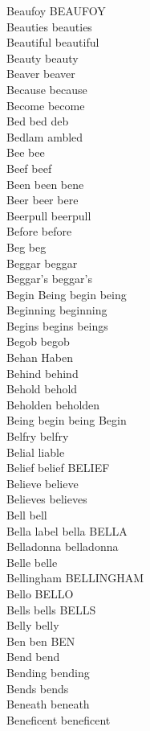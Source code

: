 Beaufoy BEAUFOY\\
Beauties beauties\\
Beautiful beautiful\\
Beauty beauty\\
Beaver beaver\\
Because because\\
Become become\\
Bed bed deb\\
Bedlam ambled\\
Bee bee\\
Beef beef\\
Been been bene\\
Beer beer bere\\
Beerpull beerpull\\
Before before\\
Beg beg\\
Beggar beggar\\
Beggar's beggar's\\
Begin Being begin being\\
Beginning beginning\\
Begins begins beings\\
Begob begob\\
Behan Haben\\
Behind behind\\
Behold behold\\
Beholden beholden\\
Being begin being Begin\\
Belfry belfry\\
Belial liable\\
Belief belief BELIEF\\
Believe believe\\
Believes believes\\
Bell bell\\
Bella label bella BELLA\\
Belladonna belladonna\\
Belle belle\\
Bellingham BELLINGHAM\\
Bello BELLO\\
Bells bells BELLS\\
Belly belly\\
Ben ben BEN\\
Bend bend\\
Bending bending\\
Bends bends\\
Beneath beneath\\
Beneficent beneficent\\
